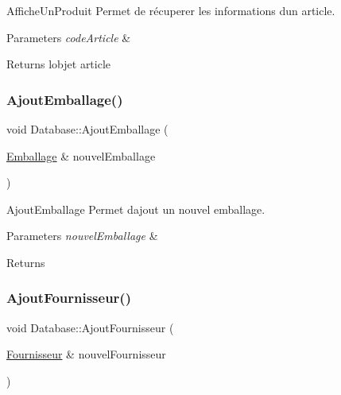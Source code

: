 Affiche\+Un\+Produit Permet de récuperer les informations d\textquotesingle{}un article. 


\begin{DoxyParams}{Parameters}
{\em code\+Article} & \\
\hline
\end{DoxyParams}
\begin{DoxyReturn}{Returns}
l\textquotesingle{}objet article 
\end{DoxyReturn}
\mbox{\label{class_database_adbb6aa8fc1eec2686a5488fb167280f2}} 
\subsubsection{\texorpdfstring{Ajout\+Emballage()}{AjoutEmballage()}}
{\footnotesize\ttfamily void Database\+::\+Ajout\+Emballage (\begin{DoxyParamCaption}\item[{\mbox{\hyperlink{class_emballage}{Emballage}} \&}]{nouvel\+Emballage }\end{DoxyParamCaption})}



Ajout\+Emballage Permet d\textquotesingle{}ajout un nouvel emballage. 


\begin{DoxyParams}{Parameters}
{\em nouvel\+Emballage} & \\
\hline
\end{DoxyParams}
\begin{DoxyReturn}{Returns}

\end{DoxyReturn}
\mbox{\label{class_database_a4ec01a690278809aa48a1c2c3ce6001d}} 
\subsubsection{\texorpdfstring{Ajout\+Fournisseur()}{AjoutFournisseur()}}
{\footnotesize\ttfamily void Database\+::\+Ajout\+Fournisseur (\begin{DoxyParamCaption}\item[{\mbox{\hyperlink{class_fournisseur}{Fournisseur}} \&}]{nouvel\+Fournisseur }\end{DoxyParamCaption})}



